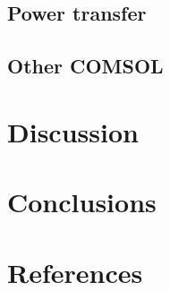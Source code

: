 \documentclass[11pt]{iopart}
\begin{document}
\subsection{Power transfer}
\subsection{Other COMSOL}


\section{Discussion}

\section{Conclusions}

\section{References}
\end{document}

